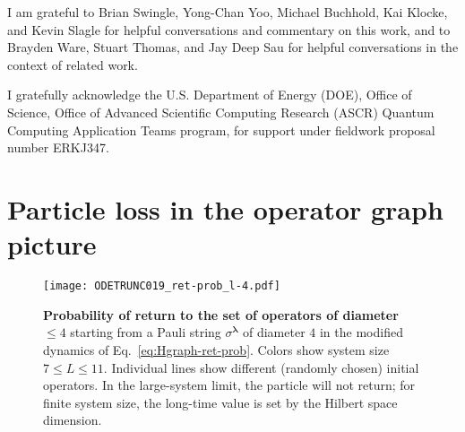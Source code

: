 \documentclass[aps,prb,nofootinbib,twocolumn,balancelastpage,amsmath,amssymb,floatfix,superscriptaddress,]{revtex4-1}
\begin{document}


\begin{acknowledgements}

  I am grateful to Brian Swingle, Yong-Chan Yoo, Michael Buchhold, Kai Klocke, and Kevin Slagle for helpful conversations and commentary on this work, and to Brayden Ware, Stuart Thomas, and Jay Deep Sau for helpful conversations in the context of related work.

  I gratefully acknowledge the U.S. Department of Energy (DOE), Office of Science, Office of Advanced Scientific Computing Research (ASCR) Quantum Computing Application Teams program, for support under fieldwork proposal number ERKJ347.
\end{acknowledgements}



\appendix



\section{Particle loss in the operator graph picture} \label{ss:fact-loss}

\begin{figure}
  \texttt{[image: ODETRUNC019\_ret-prob\_l-4.pdf]}
  \caption{\textbf{Probability of return to the set of operators of diameter $\le 4$} starting from a Pauli string $\sigma^{\bm \lambda}$ of diameter $4$ in the modified dynamics of Eq.~\eqref{eq:Hgraph-ret-prob}.
    Colors show system size $7 \le L \le 11$.
    Individual lines show different (randomly chosen) initial operators.
    In the large-system limit, the particle will not return;
    for finite system size,
    the long-time value is set by the Hilbert space dimension.
  }
  \label{fig:ret-prob}
\end{figure}
\end{document}
